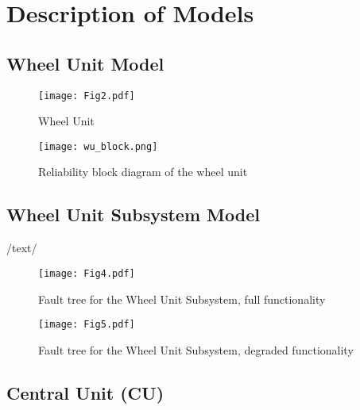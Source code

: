\newpage
\section{Description of Models}

\subsection{Wheel Unit Model}
\begin{figure}[H]
  \centering
  \texttt{[image: Fig2.pdf]}
  \caption{Wheel Unit}
  \label{fig2}
\end{figure}
\begin{figure}[H]
  \centering
  \texttt{[image: wu\_block.png]}
  \caption{Reliability block diagram of the wheel unit}
  \label{fig3}
\end{figure}
\subsection{Wheel Unit Subsystem Model}
/text/
\begin{figure}[H]
  \centering
  \texttt{[image: Fig4.pdf]}
  \caption{Fault tree for the Wheel Unit Subsystem, full functionality}
  \label{fig4}
\end{figure}
\begin{figure}[H]
  \centering
  \texttt{[image: Fig5.pdf]}
  \caption{Fault tree for the Wheel Unit Subsystem, degraded functionality}
  \label{fig5}
\end{figure}
\subsection{Central Unit (CU)}
